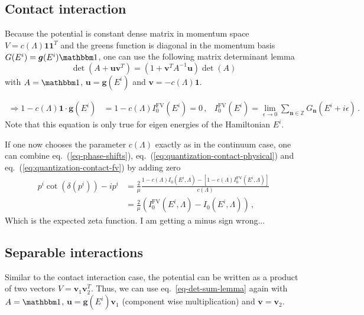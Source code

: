 \documentclass[
    aps,
    prl,
    showkeys,
    nofootinbib,
    floatfix
]{revtex4}
\renewcommand{\vec}[1]{\boldsymbol{#1}}
\begin{document}
\subsection{Contact interaction}

Because the potential is constant dense matrix in momentum space $V = c(\Lambda) \vec 1 \vec 1^T$ and the greens function is diagonal in the momentum basis  $G(E^i) = \vec g(E^i) \mathbbm 1$, one can use the following matrix determinant lemma
\begin{equation}\label{eq-det-sum-lemma}
	\det\left({A}+ \vec u \vec v^T\right)=\left(1+\vec{v}^{T} {A}^{-1} \vec{u}\right) \det({A})
\end{equation}
with $A = \mathbbm 1$, $\vec u = \vec g(E^i)$ and $\vec v = - c(\Lambda) \vec 1$.

\begin{align}\label{eq:quantization-contact-fv}
	\Rightarrow
	1 - c(\Lambda) \vec 1 \cdot \vec g(E^i) &= 1 - c(\Lambda) I_0^{\mathrm{FV}}(E^i) = 0 \, , &
	I_0^{\mathrm{FV}}(E^i) = \lim\limits_{\epsilon \to 0}\sum\limits_{\vec n \in \mathbb Z} G_{\vec n}(E^i + i \epsilon) \, .
\end{align}
Note that this equation is only true for eigen energies of the Hamiltonian $E^i$.

If one now chooses the parameter $c(\Lambda)$ exactly as in the continuum case, one can combine eq.~(\ref{eq-phase-shifts}), eq.~(\ref{eq:quantization-contact-physical}) and eq.~(\ref{eq:quantization-contact-fv}) by adding zero
\begin{align}
	p^i \cot(\delta(p^i)) -i p^i 
	&= 
	\frac{2}{\mu} \frac{1 - c(\Lambda) I_0(E^i, \Lambda) - \left[ 1 - c(\Lambda) I_0^{\mathrm{FV}}(E^i, \Lambda) \right]}{c(\Lambda)}
	\\ &=
	\frac{2}{\mu} \left( I_0^{\mathrm{FV}}(E^i, \Lambda) - I_0(E^i, \Lambda)\right)
	\, ,
\end{align}
Which is the expected zeta function.
{\color{red} I am getting a minus sign wrong...}


\subsection{Separable interactions}

Similar to the contact interaction case, the potential can be written as a product of two vectors $V = \vec v_1 \vec v_2^T$.
Thus, we can use eq.~\ref{eq-det-sum-lemma} again with $A = \mathbbm 1$, $\vec u = \vec g(E^i) \vec v_1$ (component wise multiplication) and $\vec v = \vec v_2$.
\end{document}
